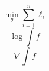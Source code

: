 \documentclass{article}
\begin{document}
\[ \min_\theta\sum_{i=1}^n\ell_i \]
\[ \log\int f \]
\[ \nabla\int f \]
\end{document}
